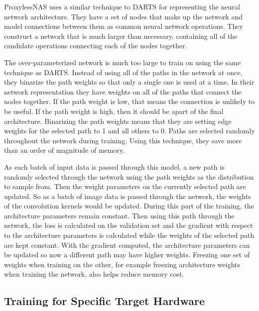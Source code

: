 \documentclass{ieee}
\begin{document}
ProxylessNAS uses a similar technique to DARTS for representing the neural network architecture. They have a set of nodes that make up the network and model connections between them as common neural network operations. They construct a network that is much larger than necessary, containing all of the candidate operations connecting each of the nodes together.

The over-parameterized network is much too large to train on using the same technique as DARTS. Instead of using all of the paths in the network at once, they binarize the path weights so that only a single one is used at a time. In their network representation they have weights on all of the paths that connect the nodes together. If the path weight is low, that means the connection is unlikely to be useful. If the path weight is high, then it should be apart of the final architecture. Binarizing the path weights means that they are setting edge weights for the selected path to 1 and all others to 0. Paths are selected randomly throughout the network during training. Using this technique, they save more than an order of magnitude of memory.

As each batch of input data is passed through this model, a new path is randomly selected through the network using the path weights as the distribution to sample from. Then the weight parameters on the currently selected path are updated. So as a batch of image data is passed through the network, the weights of the convolution kernels would be updated. During this part of the training, the architecture parameters remain constant. Then using this path through the network, the loss is calculated on the validation set and the gradient with respect to the architecture parameters is calculated while the weights of the selected path are kept constant. With the gradient computed, the architecture parameters can be updated so now a different path may have higher weights. Freezing one set of weights when training on the other, for example freezing architecture weights when training the network, also helps reduce memory cost.

\subsection{Training for Specific Target Hardware}
\end{document}
